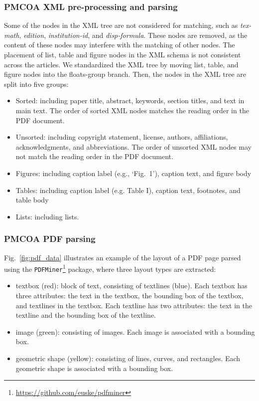 \documentclass[conference]{IEEEtran}
\begin{document}
\subsubsection{PMCOA XML pre-processing and parsing}

Some of the nodes in the XML tree are not considered for matching, such as \emph{tex-math}, \emph{edition}, \emph{institution-id}, and \emph{disp-formula}. These nodes are removed, as the content of these nodes may interfere with the matching of other nodes. The placement of list, table and figure nodes in the XML schema is not consistent across the articles. We standardized the XML tree by moving list, table, and figure nodes into the floats-group branch. Then, the nodes in the XML tree are split into five groups:
\begin{itemize}
  \item Sorted: including paper title, abstract, keywords, section titles, and text in main text. The order of sorted XML nodes matches the reading order in the PDF document.
  \item Unsorted: including copyright statement, license, authors, affiliations, acknowledgments, and abbreviations. The order of unsorted XML nodes may not match the reading order in the PDF document.
  \item Figures: including caption label (e.g., `Fig.~1'), caption text, and figure body
  \item Tables: including caption label (e.g. Table I), caption text, footnotes, and table body
  \item Lists: including lists.
\end{itemize}

\subsubsection{PMCOA PDF parsing}
\label{sec:pdf}
Fig.~\ref{fig:pdf_data} illustrates an example of the layout of a PDF page parsed using the \texttt{PDFMiner}\footnote{\url{https://github.com/euske/pdfminer}} package, where three layout types are extracted:
\begin{itemize}
  \item textbox (red): block of text, consisting of textlines (blue). Each textbox has three attributes: the text in the textbox, the bounding box of the textbox, and textlines in the textbox. Each textline has two attributes: the text in the textline and the bounding box of the textline.
  \item image (green): consisting of images. Each image is associated with a bounding box.
  \item geometric shape (yellow): consisting of lines, curves, and rectangles. Each geometric shape is associated with a bounding box.
\end{itemize}
\end{document}

